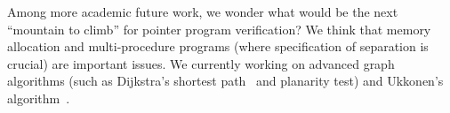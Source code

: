 Among more academic future work, we wonder what would be the next
``mountain to climb'' for pointer program verification? We think that
memory allocation and multi-procedure programs (where specification of
separation is crucial) are important issues. We currently working on 
advanced graph algorithms (such as Dijkstra's shortest path~\cite{moore05tphols} and
planarity test) and Ukkonen's algorithm~\cite{ukkonen95}.



